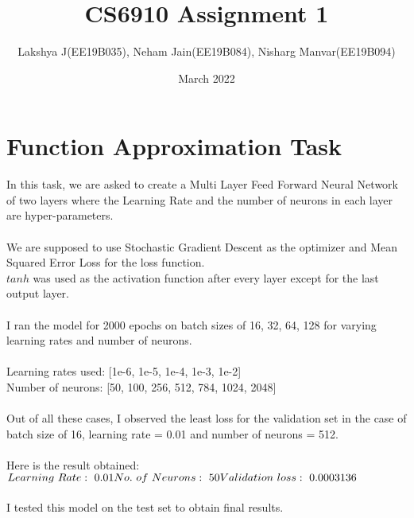 \documentclass{article}
\title{CS6910 Assignment 1}
\author{Lakshya J(EE19B035), Neham Jain(EE19B084), Nisharg Manvar(EE19B094)}
\date{March 2022}
\begin{document}
\maketitle

\section{Function Approximation Task}
In this task, we are asked to create a Multi Layer Feed Forward Neural Network of two layers where the Learning Rate and the number of neurons in each layer are hyper-parameters.\\
\\
We are supposed to use Stochastic Gradient Descent as the optimizer and Mean Squared Error Loss for the loss function.\\
$tanh$ was used as the activation function after every layer except for the last output layer.\\
\\
I ran the model for 2000 epochs on  batch sizes of 16, 32, 64, 128 for varying learning rates and number of neurons.\\
\\
Learning rates used: [1e-6, 1e-5, 1e-4, 1e-3, 1e-2]\\
Number of neurons: [50, 100, 256, 512, 784, 1024, 2048]\\
\\
Out of all these cases, I observed the least loss for the validation set in the case of batch size of 16, learning rate = 0.01 and number of neurons = 512.\\
\\
Here is the result obtained:\\
$Learning\ Rate:\ 0.01\\
No.\ of\ Neurons:\ 50\\
Validation\ loss:\ 0.0003136$\\
\\
I tested this model on the test set to obtain final results.
\\
\newpage
\end{document}
